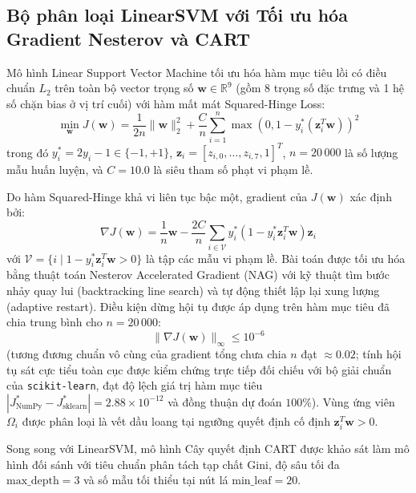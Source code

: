 \subsection{Bộ phân loại LinearSVM với Tối ưu hóa Gradient Nesterov và CART}
\label{subsec:linearsvm}
Mô hình Linear Support Vector Machine tối ưu hóa hàm mục tiêu lồi có điều chuẩn $L_2$ trên toàn bộ vector trọng số $\mathbf{w} \in \mathbb{R}^9$ (gồm 8 trọng số đặc trưng và 1 hệ số chặn bias ở vị trí cuối) với hàm mất mát Squared-Hinge Loss:
\begin{equation}
\min_{\mathbf{w}} J(\mathbf{w}) = \frac{1}{2n}\|\mathbf{w}\|_2^2 + \frac{C}{n}\sum_{i=1}^n \max\left(0, 1 - y_i^* (\mathbf{z}_i^T \mathbf{w})\right)^2
\label{eq:svm_objective}
\end{equation}
trong đó $y_i^* = 2y_i - 1 \in \{-1, +1\}$, $\mathbf{z}_i = [z_{i,0}, \dots, z_{i,7}, 1]^T$, $n = 20\,000$ là số lượng mẫu huấn luyện, và $C = 10.0$ là siêu tham số phạt vi phạm lề.

Do hàm Squared-Hinge khả vi liên tục bậc một, gradient của $J(\mathbf{w})$ xác định bởi:
\begin{equation}
\nabla J(\mathbf{w}) = \frac{1}{n}\mathbf{w} - \frac{2C}{n}\sum_{i \in \mathcal{V}} y_i^* (1 - y_i^* \mathbf{z}_i^T \mathbf{w})\mathbf{z}_i
\end{equation}
với $\mathcal{V} = \{i \mid 1 - y_i^* \mathbf{z}_i^T \mathbf{w} > 0\}$ là tập các mẫu vi phạm lề. Bài toán được tối ưu hóa bằng thuật toán Nesterov Accelerated Gradient (NAG) với kỹ thuật tìm bước nhảy quay lui (backtracking line search) và tự động thiết lập lại xung lượng (adaptive restart). Điều kiện dừng hội tụ được áp dụng trên hàm mục tiêu đã chia trung bình cho $n = 20\,000$:
\begin{equation}
\|\nabla J(\mathbf{w})\|_\infty \le 10^{-6}
\end{equation}
(tương đương chuẩn vô cùng của gradient tổng chưa chia $n$ đạt $\approx 0.02$; tính hội tụ sát cực tiểu toàn cục được kiểm chứng trực tiếp đối chiếu với bộ giải chuẩn của \texttt{scikit-learn}, đạt độ lệch giá trị hàm mục tiêu $|J_{\text{NumPy}}^* - J_{\text{sklearn}}^*| = 2.88 \times 10^{-12}$ và đồng thuận dự đoán $100\%$). Vùng ứng viên $\Omega_i$ được phân loại là vết dầu loang tại ngưỡng quyết định cố định $\mathbf{z}_i^T \mathbf{w} > 0$.

Song song với LinearSVM, mô hình Cây quyết định CART được khảo sát làm mô hình đối sánh với tiêu chuẩn phân tách tạp chất Gini, độ sâu tối đa $\text{max\_depth} = 3$ và số mẫu tối thiểu tại nút lá $\text{min\_leaf} = 20$.
